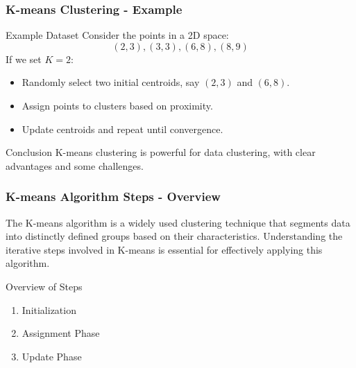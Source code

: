 \documentclass[aspectratio=169]{beamer}
\begin{document}
\begin{frame}[fragile]
    \frametitle{K-means Clustering - Example}
    \begin{block}{Example Dataset}
        Consider the points in a 2D space:
        \[
        (2, 3), (3, 3), (6, 8), (8, 9)
        \]
        If we set \( K = 2 \):
        \begin{itemize}
            \item Randomly select two initial centroids, say \( (2, 3) \) and \( (6, 8) \).
            \item Assign points to clusters based on proximity.
            \item Update centroids and repeat until convergence.
        \end{itemize}
    \end{block}
    
    \begin{block}{Conclusion}
        K-means clustering is powerful for data clustering, with clear advantages and some challenges.
    \end{block}
\end{frame}

\begin{frame}[fragile]
    \frametitle{K-means Algorithm Steps - Overview}
    The K-means algorithm is a widely used clustering technique that segments data into distinctly defined groups based on their characteristics. Understanding the iterative steps involved in K-means is essential for effectively applying this algorithm.
    
    \begin{block}{Overview of Steps}
        \begin{enumerate}
            \item Initialization
            \item Assignment Phase
            \item Update Phase
        \end{enumerate}
    \end{block}
\end{frame}
\end{document}
